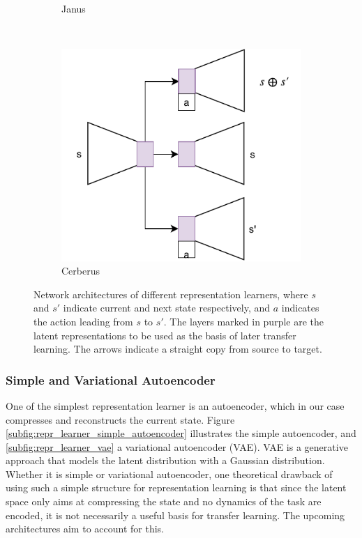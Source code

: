 \begin{figure}[ht!]
\begin{subfigure}{0.5\columnwidth}
		\caption{Janus}
		\label{subfig:repr_learner_janus}
	\end{subfigure}%
	~ 
	\begin{subfigure}{0.5\columnwidth}
		\centering
		\includegraphics[width=\linewidth]{img/cerberus.pdf}
		\caption{Cerberus}
		\label{subfig:repr_learner_cerberus}
	\end{subfigure}
	\caption{Network architectures of different representation learners, where $s$ and $s'$ indicate current and next state respectively, and $a$ indicates the action leading from $s$ to $s'$. 
	The layers marked in purple are the latent representations to be used as the basis of later transfer learning. 
	The arrows indicate a straight copy from source to target.
	}
	\label{fig:repr_learner}
\end{figure}

\subsubsection{Simple and Variational Autoencoder}
One of the simplest representation learner is an autoencoder, which in our case compresses and reconstructs the current state. %
Figure \ref{subfig:repr_learner_simple_autoencoder} illustrates the simple autoencoder, and \ref{subfig:repr_learner_vae} a variational autoencoder (VAE). 
VAE is a generative approach that models the latent distribution with a Gaussian distribution.
Whether it is simple or variational autoencoder,
one theoretical drawback of using such a simple structure for representation learning is that since the latent space only aims at compressing the state and no dynamics of the task are encoded, it is not necessarily a useful basis for transfer learning.
The upcoming architectures aim to account for this.

